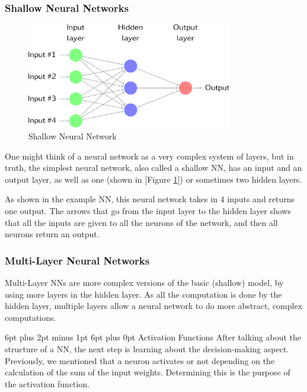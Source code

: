 \documentclass[12pt,a4paper]{article}
\makeatletter
\renewcommand\subsection{\@startsection {subsection}{1}{2mm} %
                               {6pt plus 2pt minus 1pt} %
                               {6pt plus 0pt} %
                               {\normalfont\bfseries}}
\makeatother
\begin{document}
\subsubsection{Shallow Neural Networks}
\begin{figure}[ht]
	\includegraphics[width=0.8\textwidth]{shallow}
	\centering
	\caption{Shallow Neural Network  \protect \cite{rob_j_hyndman_forecasting:_2018}}
	\label{fig:2}
\end{figure}
One might think of a neural network as a very complex system of layers, but in truth, the simplest neural network, also called a shallow NN, has an input and an output layer, as well as one (shown in [Figure \ref{fig:2}]) or sometimes two hidden layers.\par
As shown in the example NN, this neural network takes in 4 inputs and returns one output. The arrows that go from the input layer to the hidden layer shows that all the inputs are given to all the neurons of the network, and then all neurons return an output.
\subsubsection{Multi-Layer Neural Networks}
Multi-Layer NNs are more complex versions of the basic (shallow) model, by using more layers in the hidden layer. As all the computation is done by the hidden layer, multiple layers allow a neural network to do more abstract, complex computations.\par

\subsection{Activation Functions}
After talking about the structure of a NN, the next step is learning about the decision-making aspect. Previously, we mentioned that a neuron activates or not depending on the calculation of the sum of the input weights. Determining this is the purpose of the activation function.\par
\end{document}
